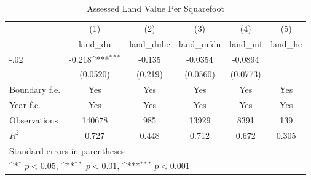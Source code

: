 \begin{table}[htbp]\centering
\def\sym#1{\ifmmode^{#1}\else\(^{#1}\)\fi}
\caption{Assessed Land Value Per Squarefoot}
\begin{tabular}{l*{5}{c}}
\hline\hline
                    &\multicolumn{1}{c}{(1)}&\multicolumn{1}{c}{(2)}&\multicolumn{1}{c}{(3)}&\multicolumn{1}{c}{(4)}&\multicolumn{1}{c}{(5)}\\
                    &\multicolumn{1}{c}{land\_du}&\multicolumn{1}{c}{land\_duhe}&\multicolumn{1}{c}{land\_mfdu}&\multicolumn{1}{c}{land\_mf}&\multicolumn{1}{c}{land\_he}\\
\hline
-.02                &      -0.218\sym{***}&      -0.135         &     -0.0354         &     -0.0894         &                     \\
                    &    (0.0520)         &     (0.219)         &    (0.0560)         &    (0.0773)         &                     \\
[1em]
Boundary f.e.       &         Yes         &         Yes         &         Yes         &         Yes         &         Yes         \\
[1em]
Year f.e.           &         Yes         &         Yes         &         Yes         &         Yes         &         Yes         \\
\hline
Observations        &      140678         &         985         &       13929         &        8391         &         139         \\
\(R^{2}\)           &       0.727         &       0.448         &       0.712         &       0.672         &       0.305         \\
\hline\hline
\multicolumn{6}{l}{\footnotesize Standard errors in parentheses}\\
\multicolumn{6}{l}{\footnotesize \sym{*} \(p<0.05\), \sym{**} \(p<0.01\), \sym{***} \(p<0.001\)}\\
\end{tabular}
\end{table}

